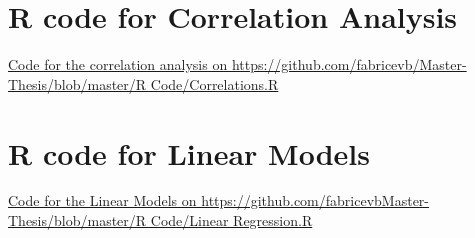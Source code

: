 \documentclass[12pt,a4paper,oneside]{book}
\begin{document}
\section*{R code for Correlation Analysis}

\href{https://github.com/fabricevb/Master-Thesis/blob/master/R Code/Correlations.R}{Code for the correlation analysis on https://github.com/fabricevb/Master-Thesis/blob/master/R Code/Correlations.R}




\section*{R code for Linear Models}

\href{https://github.com/fabricevb/Master-Thesis/blob/master/R Code/Linear Regression.R}{Code for the Linear Models on https://github.com/fabricevbMaster-Thesis/blob/master/R Code/Linear Regression.R}



\newpage
\end{document}
